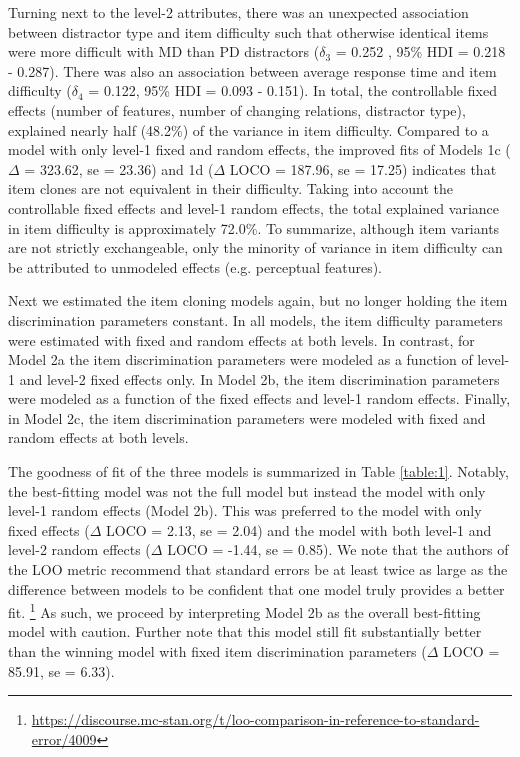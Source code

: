 \documentclass[a4paper,man,natbib]{apa6}
\begin{document}
Turning next to the level-2 attributes, there was an unexpected association between distractor type and item difficulty such that otherwise identical items were more difficult with MD than PD distractors ($\delta_3$ = 0.252 , 95\% HDI = 0.218 - 0.287). There was also an association between average response time and item difficulty ($\delta_4$ = 0.122, 95\% HDI = 0.093 - 0.151). In total, the controllable fixed effects (number of features, number of changing relations, distractor type), explained nearly half (48.2\%) of the variance in item difficulty. Compared to a model with only level-1 fixed and random effects, the improved fits of Models 1c ($\Delta$ = 323.62, se = 23.36) and 1d ($\Delta$ LOCO = 187.96, se = 17.25) indicates that item clones are not equivalent in their difficulty. Taking into account the controllable fixed effects and level-1 random effects, the total explained variance in item difficulty is approximately 72.0\%. To summarize, although item variants are not strictly exchangeable, only the minority of variance in item difficulty can be attributed to unmodeled effects (e.g. perceptual features). 

Next we estimated the item cloning models again, but no longer holding the item discrimination parameters constant. In all models, the item difficulty parameters were estimated with fixed and random effects at both levels. In contrast, for Model 2a the item discrimination parameters were modeled as a function of level-1 and level-2 fixed effects only. In Model 2b, the item discrimination parameters were modeled as a function of the fixed effects and level-1 random effects. Finally, in Model 2c, the item discrimination parameters were modeled with fixed and random effects at both levels.  

The goodness of fit of the three models is summarized in Table \ref{table:1}. Notably, the best-fitting model was not the full model but instead the model with only level-1 random effects (Model 2b). This was preferred to the model with only fixed effects ($\Delta$ LOCO = 2.13, se = 2.04) and the model with both level-1 and level-2 random effects ($\Delta$ LOCO = -1.44, se = 0.85). We note that the authors of the LOO metric recommend that standard errors be at least twice as large as the difference between models to be confident that one model truly provides a better fit. \footnote{\url{https://discourse.mc-stan.org/t/loo-comparison-in-reference-to-standard-error/4009}} As such, we proceed by interpreting Model 2b as the overall best-fitting model with caution. Further note that this model still fit substantially better than the winning model with fixed item discrimination parameters ($\Delta$ LOCO = 85.91, se = 6.33).
\end{document}
